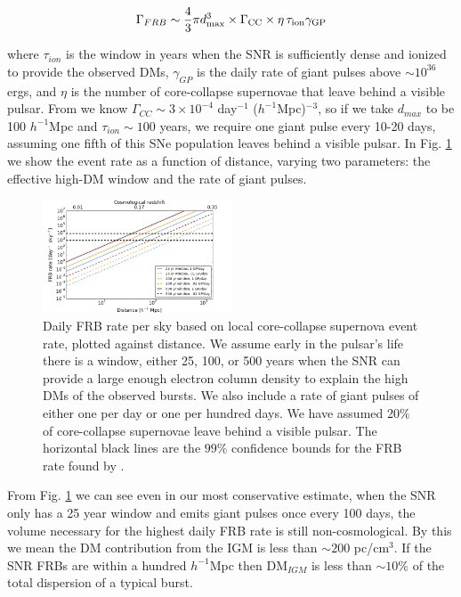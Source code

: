 \documentclass[useAMS,usenatbib]{mn2e}
\begin{document}
\begin{equation}
\Gamma_{FRB} \sim  \frac{4}{3} \pi d_{\rm max}^3 \times \Gamma_{\rm CC} \times
 \eta \, \tau_{\rm ion} \gamma_{\rm GP}
\end{equation}

\noindent where $\tau_{ion}$ is the window in years when the SNR is sufficiently
dense and ionized to provide the observed DMs, $\gamma_{GP}$
is the daily rate of giant pulses above $\sim10^{36}$ ergs, and $\eta$
is the number of core-collapse supernovae that leave behind a visible pulsar. 
From \cite{2014ApJ...792..135T} we know  
$\Gamma_{CC}\sim3 \times 10^{-4}$ day$^{-1}$ ($h^{-1}$Mpc)$^{-3}$,
so if we take $d_{max}$ to be 100 $h^{-1}$Mpc and $\tau_{ion}\sim100$ years,
we require one giant pulse every 10-20 days, assuming one fifth of this SNe population
leaves behind a visible pulsar.
In Fig. \ref{FIG-RATE} 
we show the event rate as a function of distance, varying two parameters: the 
effective high-DM window and the rate of giant pulses. 

\begin{figure}
\label{FIG-RATE}
  \centering
   \includegraphics[width=0.5\textwidth]{FRB_SNR_rate.png}
   \caption{Daily FRB rate per sky based on local core-collapse supernova 
   event rate, plotted against distance.
   We assume early in the pulsar's life there is a window, either 
   25, 100, or 500 years when the SNR can provide a large enough electron 
   column density to explain the high DMs of the observed bursts. We also
   include a rate of giant pulses of either one per day or one per hundred
   days. We have assumed 20$\%$ of core-collapse supernovae leave behind
   a visible pulsar.
   The horizontal black lines are the $99\%$ confidence bounds for the FRB rate
   found by \protect\cite{2015arXiv150500834R}.}
\end{figure}

From Fig. \ref{FIG-RATE} we can see even in our most conservative estimate, when
the SNR only has a 25 year window and emits giant pulses once every
100 days, the volume necessary for the highest daily FRB rate is still non-cosmological.
By this we mean the DM contribution from the IGM is less than $\sim 200$ pc/cm$^3$.
If the SNR FRBs are within a hundred $h^{-1}$Mpc then DM$_{IGM}$ is less than 
$\sim 10 \%$  of the total dispersion of a typical burst.
\end{document}
